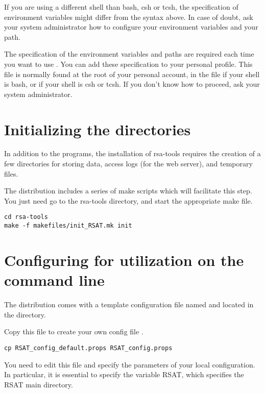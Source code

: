 \documentclass{book}
\begin{document}
If you are using a different shell than bash, csh or tcsh, the
specification of environment variables might differ from the syntax
above.  In case of doubt, ask your system administrator how to
configure your environment variables and your path.

The specification of the environment variables and paths are required
each time you want to use \RSAT. You can add these specification to
your personal profile.  This file is normally found at the root of
your personal account, in the file  if your shell is
bash, or  if your shell is csh or tcsh. If you don't know
how to proceed, ask your system administrator.



\section{Initializing the directories}

In addition to the programs, the installation of rsa-tools requires
the creation of a few directories for storing data, access logs (for
the web server), and temporary files.  

The distribution includes a series of make scripts which will
facilitate this step. You just need go to the rsa-tools directory, and
start the appropriate make file.

\begin{verbatim}
cd rsa-tools
make -f makefiles/init_RSAT.mk init
\end{verbatim}


\section{Configuring \RSAT for utilization on the command line}

The \RSAT distribution comes with a template configuration file named
 and located in the 
directory.

Copy this file to create your own config file .

\begin{verbatim}
cp RSAT_config_default.props RSAT_config.props 
\end{verbatim}

You need to edit this file and specify the parameters of your local
configuration. In particular, it is essential to specify the variable
RSAT, which specifies the RSAT main directory. 
\end{document}
